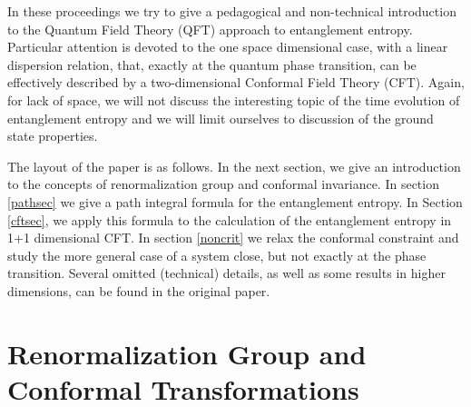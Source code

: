 \documentclass[12pt]{article}
\begin{document}
In these proceedings we try to give a pedagogical and non-technical 
introduction to the Quantum Field Theory (QFT) approach to entanglement
entropy.\cite{cc-04} 
Particular attention is devoted to the one space dimensional 
case, with a linear dispersion relation, that, exactly at the quantum phase 
transition, can be effectively described by a two-dimensional Conformal 
Field Theory (CFT).
Again, for lack of space, we will not discuss the interesting topic of 
the time evolution of entanglement entropy\cite{cc-05} and we will limit
ourselves to discussion of the ground state properties.


The layout of the paper is as follows. In the next section, we 
give an introduction to the concepts of renormalization group 
and conformal invariance. 
In section \ref{pathsec} we
give a path integral formula for the entanglement entropy. 
In Section \ref{cftsec}, we apply this formula to the calculation of the 
entanglement entropy in 1+1 dimensional CFT. In section \ref{noncrit}
we relax the conformal constraint and study the more general case of a 
system close, but not exactly at the phase transition.
Several omitted (technical) details, as well as some results in higher 
dimensions, can be found in the original paper.\cite{cc-04}




\section{Renormalization Group and Conformal Transformations}
\end{document}
